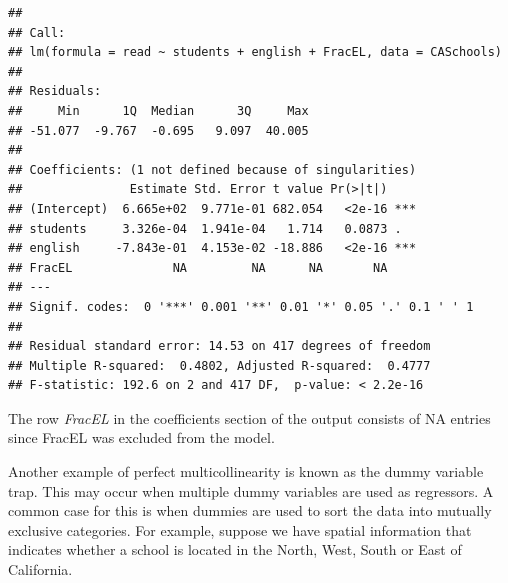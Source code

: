 \documentclass[]{book}
\newenvironment{Shaded}{\begin{snugshade}}{\end{snugshade}}
\newcommand{\CommentTok}[1]{\textcolor[rgb]{0.56,0.35,0.01}{\textit{#1}}}
\newcommand{\DataTypeTok}[1]{\textcolor[rgb]{0.13,0.29,0.53}{#1}}
\newcommand{\DecValTok}[1]{\textcolor[rgb]{0.00,0.00,0.81}{#1}}
\newcommand{\KeywordTok}[1]{\textcolor[rgb]{0.13,0.29,0.53}{\textbf{#1}}}
\newcommand{\NormalTok}[1]{#1}
\newcommand{\OperatorTok}[1]{\textcolor[rgb]{0.81,0.36,0.00}{\textbf{#1}}}
\newcommand{\StringTok}[1]{\textcolor[rgb]{0.31,0.60,0.02}{#1}}
\begin{document}
\begin{verbatim}
## 
## Call:
## lm(formula = read ~ students + english + FracEL, data = CASchools)
## 
## Residuals:
##     Min      1Q  Median      3Q     Max 
## -51.077  -9.767  -0.695   9.097  40.005 
## 
## Coefficients: (1 not defined because of singularities)
##               Estimate Std. Error t value Pr(>|t|)    
## (Intercept)  6.665e+02  9.771e-01 682.054   <2e-16 ***
## students     3.326e-04  1.941e-04   1.714   0.0873 .  
## english     -7.843e-01  4.153e-02 -18.886   <2e-16 ***
## FracEL              NA         NA      NA       NA    
## ---
## Signif. codes:  0 '***' 0.001 '**' 0.01 '*' 0.05 '.' 0.1 ' ' 1
## 
## Residual standard error: 14.53 on 417 degrees of freedom
## Multiple R-squared:  0.4802, Adjusted R-squared:  0.4777 
## F-statistic: 192.6 on 2 and 417 DF,  p-value: < 2.2e-16
\end{verbatim}

The row \emph{FracEL} in the coefficients section of the output consists
of NA entries since FracEL was excluded from the model.

Another example of perfect multicollinearity is known as the dummy
variable trap. This may occur when multiple dummy variables are used as
regressors. A common case for this is when dummies are used to sort the
data into mutually exclusive categories. For example, suppose we have
spatial information that indicates whether a school is located in the
North, West, South or East of California.

\begin{Shaded}
\end{Shaded}
\end{document}
